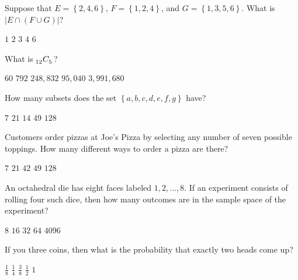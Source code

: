\documentclass[answers,12pt]{exam}
\newcommand\ncr[2]{\tensor[_{#1}]C{_{#2}}}
\begin{document}
\begin{questions}
\question Suppose that $E=\left\{2,4,6\right\}$,
$F=\left\{1,2,4\right\}$, and $G=\left\{1,3,5,6\right\}$.
What is $\left|E\cap\left(F\cup G\right)\right|$?\\
\begin{oneparchoices}
\choice $1$
\choice $2$
\correctchoice $3$
\choice $4$
\choice $6$
\end{oneparchoices}

\question What is $\ncr{12}{5}$?\\
\begin{oneparchoices}
\choice $60$ %
\correctchoice $792$
\choice $248,832$ %
\choice $95,040$ %
\choice $3,991,680$ %
\end{oneparchoices}

\question How many subsets does the set
$\left\{a,b,c,d,e,f,g\right\}$ have?\\
\begin{oneparchoices}
\choice $7$ %
\choice $21$ %
\choice $14$ %
\choice $49$ %
\correctchoice $128$
\end{oneparchoices}

\question Customers order pizzas at Joe's Pizza
by selecting any number of seven possible toppings.
How many different ways to order a pizza are there?\\
\begin{oneparchoices}
\choice $7$ %
\choice $21$ %
\choice $42$ %
\choice $49$ %
\correctchoice $128$
\end{oneparchoices}

\question An octahedral die has eight faces labeled $1,2,\ldots,8$.
If an experiment consists of rolling four such dice, then how
many outcomes are in the sample space of the experiment?\\
\begin{oneparchoices}
\choice $8$ %
\choice $16$
\choice $32$ %
\choice $64$ %
\correctchoice $4096$
\end{oneparchoices}

\question If you three coins, then what is the probability
that exactly two heads come up?\\
\begin{oneparchoices}
\choice $\frac{1}{8}$
\choice $\frac{1}{4}$
\choice $\frac{3}{8}$
\choice $\frac{1}{2}$
\choice $1$
\end{oneparchoices}



\end{questions}
\end{document}
